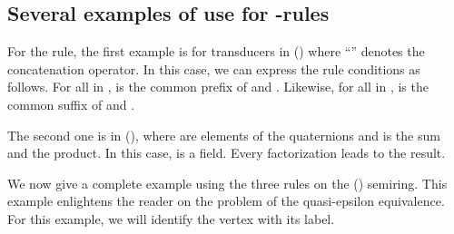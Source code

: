 \documentclass[11pt]{article}
\begin{document}
\subsection{Several examples of use for -rules}
For the  rule, the first example is for transducers in () where ``'' denotes the concatenation operator. In this case, we can express the  rule conditions as follows. For all  in ,   is the  common prefix of  and . Likewise, for all  in ,  is the  common suffix of  and  .

\medskip
{}
\medskip

The second one is in (), where  are elements of the quaternions and  is the sum and  the product.  In this case,  is a field. Every factorization leads to the result.

\medskip
{}
\medskip


We now give a complete example using the three rules on the () semiring. This example enlightens the reader on the problem of the quasi-epsilon equivalence. For this example, we will identify the vertex with its label.
\end{document}
